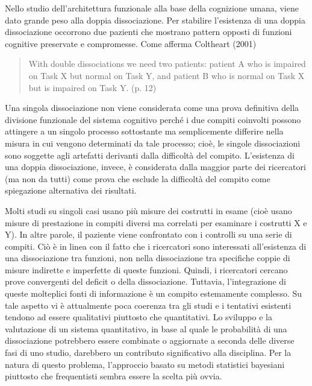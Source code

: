 Nello studio dell'architettura funzionale alla base della cognizione umana, viene dato grande peso alla doppia dissociazione. 
Per stabilire l'esistenza di una doppia dissociazione occorrono due pazienti che mostrano pattern opposti di funzioni cognitive preservate e compromesse. 
Come afferma Coltheart (2001) 
\begin{quote}
With double dissociations we need two patients: patient A who is impaired on Task X but normal on Task Y, and patient B who is normal on Task X but is impaired on Task Y. (p. 12)
\end{quote}
Una singola dissociazione non viene considerata come una prova definitiva della divisione funzionale del sistema cognitivo perché i due compiti coinvolti possono attingere a un singolo processo sottostante ma semplicemente differire nella misura in cui vengono determinati da tale processo; cioè, le singole dissociazioni sono soggette agli artefatti derivanti dalla difficoltà del compito. 
L'esistenza di una doppia dissociazione, invece, è considerata dalla maggior parte dei ricercatori (ma non da tutti) come prova che esclude la difficoltà del compito come spiegazione alternativa dei risultati.


Molti studi su singoli casi usano più misure dei costrutti in esame (cioè usano misure di prestazione in compiti diversi ma correlati per esaminare i costrutti X e Y). 
In altre parole, il paziente viene confrontato con i controlli su una serie di compiti. 
Ciò è in linea con il fatto che i ricercatori sono interessati all'esistenza di una dissociazione tra funzioni, non nella dissociazione tra specifiche coppie di misure indirette e imperfette di queste funzioni. 
Quindi, i ricercatori cercano prove convergenti del deficit o della dissociazione. 
Tuttavia, l'integrazione di queste molteplici fonti di informazione è un compito estemamente complesso. 
Su tale aspetto vi è attualmente poca coerenza tra gli studi e i tentativi esistenti tendono ad essere qualitativi piuttosto che quantitativi. 
Lo sviluppo e la valutazione di un sistema quantitativo, in base al quale le probabilità di una dissociazione potrebbero essere combinate o aggiornate a seconda delle diverse fasi di uno studio, darebbero un contributo significativo alla disciplina. 
Per la natura di questo problema, l'approccio basato su metodi statistici bayesiani piuttosto che frequentisti sembra essere la scelta più ovvia.

